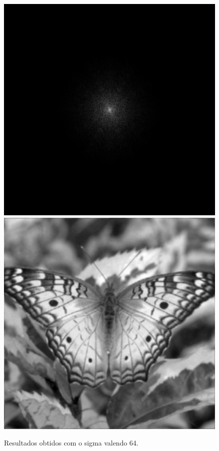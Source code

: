 \documentclass[twoside,twocolumn]{article}
\begin{document}
\begin{figure}[H]
\begin{center}
	\includegraphics[scale=.19]{figures/butterfly_mag_filter_64.png}
	\includegraphics[scale=.19]{figures/butterfly_result_64.png}
\caption{Resultados obtidos com o sigma valendo 64.} \label{mag_64}
\end{center}
\end{figure}
\end{document}
